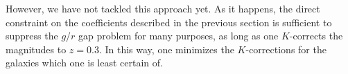 \documentclass[10pt,preprint]{aastex}
\begin{document}
However, we have not tackled this approach yet. As it happens, the
direct constraint on the coefficients described in the previous
section is sufficient to suppress the $g$/$r$ gap problem 
for many purposes, as long as one $K$-corrects the magnitudes to
$z=0.3$. In this way, one minimizes the $K$-corrections for the
galaxies which one is least certain of.





\end{document}
